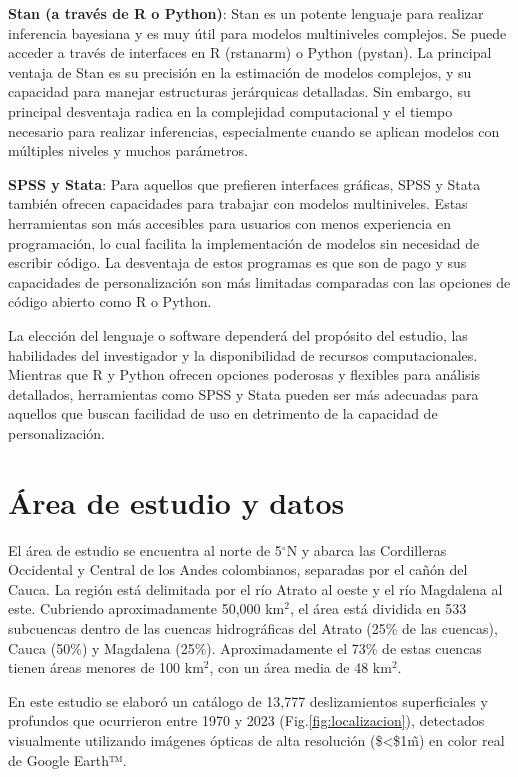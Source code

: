 \documentclass[
  manuscript=article,  
  layout=preprint,  
]{format}
\begin{document}
\textbf{Stan (a través de R o Python)}: Stan es un potente lenguaje para realizar inferencia bayesiana y es muy útil para modelos multiniveles complejos. Se puede acceder a través de interfaces en R (rstanarm) o Python (pystan). La principal ventaja de Stan es su precisión en la estimación de modelos complejos, y su capacidad para manejar estructuras jerárquicas detalladas. Sin embargo, su principal desventaja radica en la complejidad computacional y el tiempo necesario para realizar inferencias, especialmente cuando se aplican modelos con múltiples niveles y muchos parámetros.

\textbf{SPSS y Stata}: Para aquellos que prefieren interfaces gráficas, SPSS y Stata también ofrecen capacidades para trabajar con modelos multiniveles. Estas herramientas son más accesibles para usuarios con menos experiencia en programación, lo cual facilita la implementación de modelos sin necesidad de escribir código. La desventaja de estos programas es que son de pago y sus capacidades de personalización son más limitadas comparadas con las opciones de código abierto como R o Python.

La elección del lenguaje o software dependerá del propósito del estudio, las habilidades del investigador y la disponibilidad de recursos computacionales. Mientras que R y Python ofrecen opciones poderosas y flexibles para análisis detallados, herramientas como SPSS y Stata pueden ser más adecuadas para aquellos que buscan facilidad de uso en detrimento de la capacidad de personalización.

\section{Área de estudio y datos}

\par El área de estudio se encuentra al norte de 5$^{\circ}$N y abarca las Cordilleras Occidental y Central de los Andes colombianos, separadas por el cañón del Cauca. La región está delimitada por el río Atrato al oeste y el río Magdalena al este. Cubriendo aproximadamente 50,000 km$^2$, el área está dividida en 533 subcuencas dentro de las cuencas hidrográficas del Atrato (25\% de las cuencas), Cauca (50\%) y Magdalena (25\%). Aproximadamente el 73\% de estas cuencas tienen áreas menores de 100 km$^2$, con un área media de 48 km$^2$.

\par En este estudio se elaboró un catálogo de 13,777 deslizamientos superficiales y profundos que ocurrieron entre 1970 y 2023 (Fig.\ref{fig:localizacion}), detectados visualmente utilizando imágenes ópticas de alta resolución (\$<\$1\~m) en color real de Google Earth™.
\end{document}
